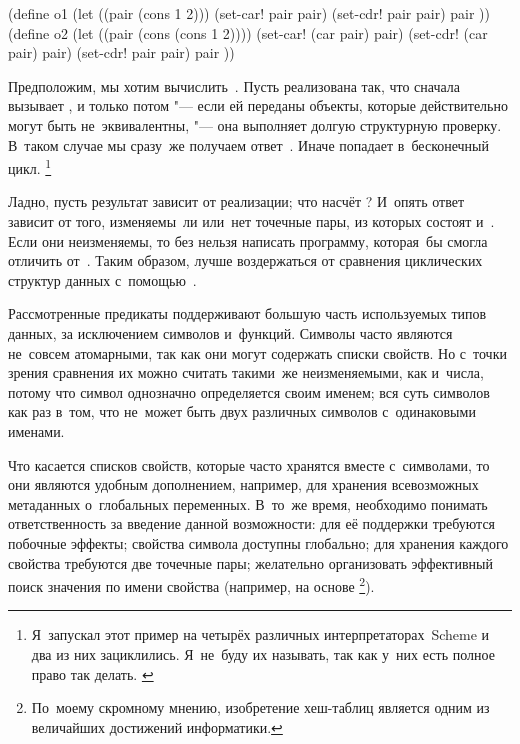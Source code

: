 

\begin{code:lisp}
(define o1 (let ((pair (cons 1 2)))
             (set-car! pair pair)
             (set-cdr! pair pair)
             pair ))
(define o2 (let ((pair (cons (cons 1 2))))
             (set-car! (car pair) pair)
             (set-cdr! (car pair) pair)
             (set-cdr! pair pair)
             pair ))
\end{code:lisp}

Предположим, мы хотим вычислить~. Пусть 
реализована так, что сначала вызывает , и только потом "--- если ей
переданы объекты, которые действительно могут быть не~эквивалентны, "--- она
выполняет долгую структурную проверку. В~таком случае мы сразу~же получаем
ответ~. Иначе  попадает в~бесконечный цикл.%
\footnote*{Я~запускал этот пример на четырёх различных интерпретаторах~Scheme и
два из них зациклились. Я~не~буду их называть, так как у~них есть полное право
так делать. \cite{kcr98}}

Ладно, пусть результат  зависит от реализации; что насчёт
? И~опять ответ зависит от того, изменяемы~ли или~нет
точечные пары, из которых состоят  и~. Если они неизменяемы, то
без  нельзя написать программу, которая~бы смогла отличить 
от~. Таким образом, лучше воздержаться от сравнения циклических структур
данных с~помощью~.

\bigskip

Рассмотренные предикаты поддерживают большую часть используемых типов данных, за
исключением символов и~функций. Символы часто являются не~совсем атомарными,
так как они могут содержать списки свойств. Но с~точки зрения сравнения их можно
считать такими~же неизменяемыми, как и~числа, потому что символ однозначно
определяется своим именем; вся суть символов как раз в~том, что не~может быть
двух различных символов с~одинаковыми именами.

Что касается списков свойств, которые часто хранятся вместе с~символами, то они
являются удобным дополнением, например, для хранения всевозможных метаданных
о~глобальных переменных. В~то~же время, необходимо понимать ответственность за
введение данной возможности: для её поддержки требуются побочные эффекты;
свойства символа доступны глобально; для хранения каждого свойства требуются две
точечные пары; желательно организовать эффективный поиск значения по имени
свойства (например, на основе \footnote{По~моему скромному
мнению, изобретение хеш-таблиц является одним из величайших достижений
информатики.}).


